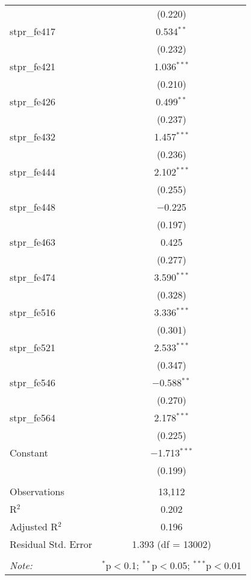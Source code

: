 \begin{table}[!htbp]
\begin{tabular}{@{\extracolsep{5pt}}lc}
  & (0.220) \\ 
  stpr\_fe417 & 0.534$^{**}$ \\ 
  & (0.232) \\ 
  stpr\_fe421 & 1.036$^{***}$ \\ 
  & (0.210) \\ 
  stpr\_fe426 & 0.499$^{**}$ \\ 
  & (0.237) \\ 
  stpr\_fe432 & 1.457$^{***}$ \\ 
  & (0.236) \\ 
  stpr\_fe444 & 2.102$^{***}$ \\ 
  & (0.255) \\ 
  stpr\_fe448 & $-$0.225 \\ 
  & (0.197) \\ 
  stpr\_fe463 & 0.425 \\ 
  & (0.277) \\ 
  stpr\_fe474 & 3.590$^{***}$ \\ 
  & (0.328) \\ 
  stpr\_fe516 & 3.336$^{***}$ \\ 
  & (0.301) \\ 
  stpr\_fe521 & 2.533$^{***}$ \\ 
  & (0.347) \\ 
  stpr\_fe546 & $-$0.588$^{**}$ \\ 
  & (0.270) \\ 
  stpr\_fe564 & 2.178$^{***}$ \\ 
  & (0.225) \\ 
  Constant & $-$1.713$^{***}$ \\ 
  & (0.199) \\ 
 \hline \\[-1.8ex] 
Observations & 13,112 \\ 
R$^{2}$ & 0.202 \\ 
Adjusted R$^{2}$ & 0.196 \\ 
Residual Std. Error & 1.393 (df = 13002) \\ 
\hline 
\hline \\[-1.8ex] 
\textit{Note:}  & \multicolumn{1}{r}{$^{*}$p$<$0.1; $^{**}$p$<$0.05; $^{***}$p$<$0.01} \\ 
\end{tabular} 
\end{table} 

